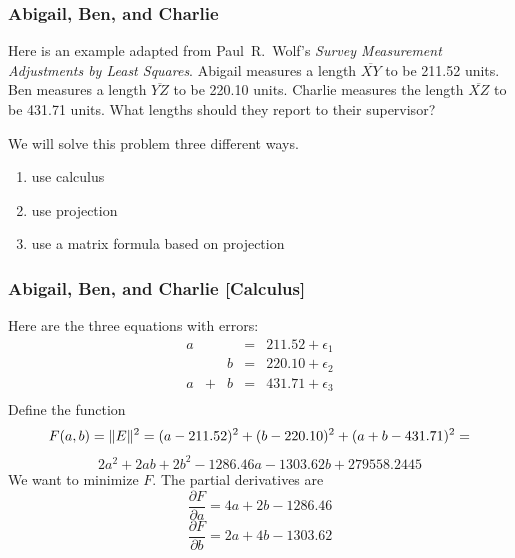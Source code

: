 \documentclass[xcolor=dvipsnames]{beamer}
\begin{document}
\begin{frame}
  \frametitle{Abigail, Ben, and Charlie}
   Here is an example adapted from
  \mbox{Paul R. Wolf's} \emph{Survey Measurement Adjustments by Least
    Squares}. Abigail measures a length $\overline{XY}$ to be 211.52 units.
  Ben measures a length $\overline{YZ}$ to be 220.10 units. Charlie
  measures the length $\overline{XZ}$ to be 431.71 units. What lengths
  should they report to their supervisor?

  \medskip

  We will solve this problem three different ways.
  \begin{enumerate}
  \item use calculus
  \item use projection
  \item use a matrix formula based on projection
  \end{enumerate}
\end{frame}

\begin{frame}
  \frametitle{Abigail, Ben, and Charlie [Calculus]}
  Here are the three equations with errors:
  \begin{equation}
    \label{eq:ohjeigoo}
    \begin{array}{ccccc}
      a&&&=&211.52+\epsilon_{1} \\
      &&b&=&220.10+\epsilon_{2} \\
      a&+&b&=&431.71+\epsilon_{3} \\
    \end{array}
  \end{equation}
  Define the function
  \begin{equation}
    \label{eq:ceexaeke}
    F(a,b)=\Vert{}E\Vert^{2}=(a-211.52)^{2}+(b-220.10)^{2}+(a+b-431.71)^{2}=\notag
  \end{equation}
  \begin{equation}
    \label{eq:shaisaht}
    2a^{2}+2ab+2b^{2}-1286.46a-1303.62b+279558.2445
  \end{equation}
  We want to minimize $F$. The partial derivatives are
  \begin{equation}
    \label{eq:ohbiecoa}
    \frac{\partial{}F}{\partial{}a}=4a+2b-1286.46
  \end{equation}
  \begin{equation}
    \label{eq:eureejoo}
    \frac{\partial{}F}{\partial{}b}=2a+4b-1303.62
  \end{equation}
\end{frame}
\end{document}
